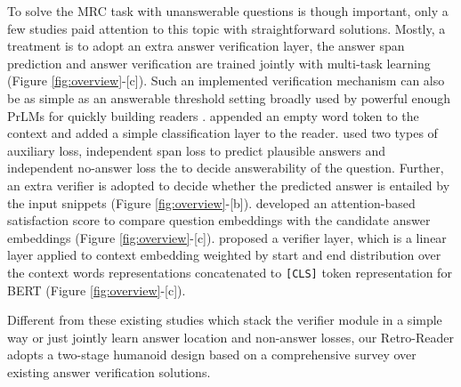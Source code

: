 \documentclass[letterpaper]{article} %
\begin{document}
To solve the MRC task with unanswerable questions is though important, only a few studies paid attention to this topic with straightforward solutions.
Mostly, a treatment is to adopt an extra answer verification layer, the answer span prediction and answer verification are trained jointly with multi-task learning (Figure \ref{fig:overview}-[c]). Such an implemented verification mechanism can also be as simple as an answerable threshold setting broadly used by powerful enough PrLMs for quickly building readers \cite{devlin2018bert,zhang2019semantics}.
\citeauthor{liu2018stochastic}  appended an empty word token to the context and added a simple classification layer to the reader. %
\citeauthor{hu2019read}  used two types of auxiliary loss, independent span loss to predict plausible answers and independent no-answer loss the to decide answerability of the question. Further, an extra verifier is adopted to decide whether the predicted answer is entailed by the input snippets (Figure \ref{fig:overview}-[b]).
\citeauthor{back2020neurquri}  developed an attention-based satisfaction score to compare question embeddings with the candidate answer embeddings (Figure \ref{fig:overview}-[c]). %
\citeauthor{zhang2019sg}  proposed a verifier layer, which is
a linear layer applied to context embedding weighted by start and end distribution over the context words representations concatenated to \texttt{[CLS]} token representation for BERT (Figure \ref{fig:overview}-[c]).


Different from these existing studies which stack the verifier module in a simple way or just jointly learn answer location and non-answer losses, our Retro-Reader adopts a two-stage humanoid design \cite{DBLP:conf/sigir/ZhengMLYZM19,doi:10.1080/00461520.1987.9653053} based on a comprehensive survey over existing answer verification solutions.
\end{document}
